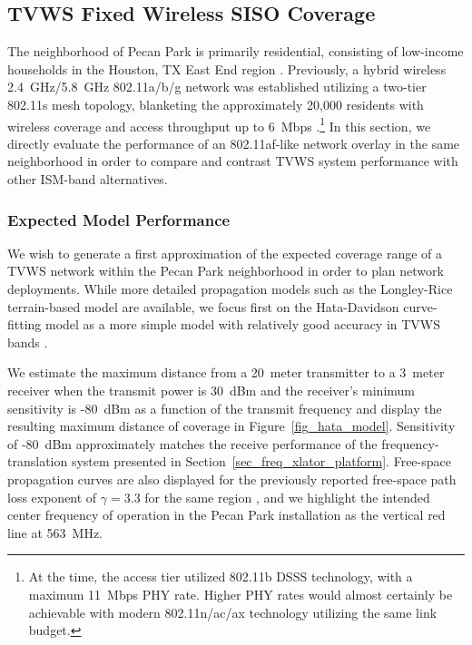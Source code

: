 \subsection{TVWS Fixed Wireless SISO Coverage}
\label{sec_tvws_fixed_siso}

	The neighborhood of Pecan Park is primarily residential, consisting of low-income households in the Houston, TX East End region \cite{camp2006developing}.
	Previously, a hybrid wireless 2.4~GHz/5.8~GHz 802.11a/b/g network was established utilizing a two-tier 802.11s mesh topology, blanketing the approximately 20,000 residents with wireless coverage and access throughput up to 6~Mbps \cite{camp2006measurement, camp2008measurement}.\footnote{At the time, the access tier utilized 802.11b \ac{DSSS} technology, with a maximum 11~Mbps \ac{PHY} rate. Higher \ac{PHY} rates would almost certainly be achievable with modern 802.11n/ac/ax technology utilizing the same link budget.}
	In this section, we directly evaluate the performance of an 802.11af-like network overlay in the same neighborhood in order to compare and contrast \ac{TVWS} system performance with other \ac{ISM}-band alternatives.

\subsubsection{Expected Model Performance}
\label{sec_hata_model}

	We wish to generate a first approximation of the expected coverage range of a \ac{TVWS} network within the Pecan Park neighborhood in order to plan network deployments.
	While more detailed propagation models such as the Longley-Rice terrain-based model are available, we focus first on the Hata-Davidson curve-fitting model as a more simple model with relatively good accuracy in \ac{TVWS} bands \cite{kasampalis2014comparison}.
		
	We estimate the maximum distance from a 20~meter transmitter to a 3~meter receiver when the transmit power is 30~dBm and the receiver’s minimum sensitivity is -80~dBm as a function of the transmit frequency and display the resulting maximum distance of coverage in Figure~\ref{fig_hata_model}.
	Sensitivity of -80~dBm approximately matches the receive performance of the frequency-translation system presented in Section~\ref{sec_freq_xlator_platform}.
	Free-space propagation curves are also displayed for the previously reported free-space path loss exponent of $\gamma = 3.3$ for the same region \cite{camp2006measurement}, and we highlight the intended center frequency of operation in the Pecan Park installation as the vertical red line at 563~MHz.
		
